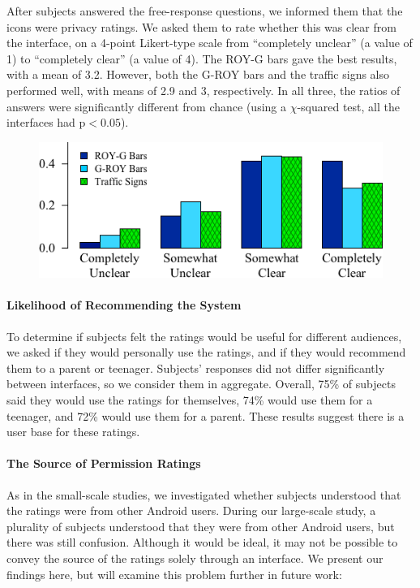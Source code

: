\documentclass[11pt]{article}
\begin{document}
After subjects answered the free-response questions, we informed them that 
the icons were privacy ratings. We asked them to rate whether this was 
clear from the interface, on a 4-point Likert-type scale from ``completely 
unclear'' (a value of 1) to ``completely clear'' (a value of 4).
The ROY-G bars gave the best results, with a mean of 3.2.
However, both the G-ROY bars and the traffic signs also performed well,
with means of 2.9 and 3, respectively. In all three, the ratios of answers were 
significantly different from chance (using a $\chi$-squared test, all the interfaces had 
$\mathrm{p}< 0.05$).
\begin{figure}[h]
\centering
    \includegraphics[width=.5\linewidth]{graphs/ClarityHistLikert.png}
    \label{likert}
\end{figure}

\paragraph{Likelihood of Recommending the System}
\label{ssec-est-usage}

To determine if subjects felt the ratings would be useful for 
different audiences, we asked if 
they would personally use the ratings, and if
they would recommend them to a parent or
teenager. Subjects' responses did not 
differ significantly between interfaces, so we consider 
them in aggregate. Overall, 75\% of subjects said they would use the
ratings for themselves, 
74\% would use them for a teenager, and 72\% would use them for a parent. 
These results suggest there is a user base for these ratings.

\paragraph{The Source of Permission Ratings}
\label{s-source}

As in the small-scale studies, we investigated whether subjects understood 
that the ratings were from other Android users.
During 
our large-scale study, a plurality of subjects understood that they were from other 
Android users, but there was still confusion. 
Although it would be ideal, it may not be possible to convey the 
source of the ratings solely through an interface.
We present our findings here, but will examine this problem further 
in future work: 
\end{document}
